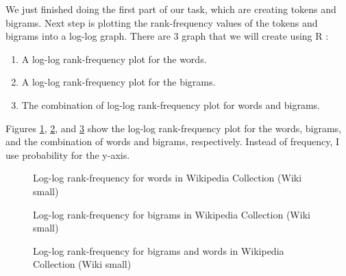 \documentclass[letterpaper,11pt]{article}
\begin{document}
We just finished doing the first part of our task, which are creating tokens and bigrams. Next step is plotting the rank-frequency values of the tokens and bigrams into a log-log graph. There are 3 graph that we will create using R \cite{r-project}:
\begin{enumerate}
\item A log-log rank-frequency plot for the words.
\item A log-log rank-frequency plot for the bigrams.
\item The combination of log-log rank-frequency plot for words and bigrams. 
\end{enumerate}

Figures \ref{fig:4_1_rank_freq_plot}, \ref{fig:4_1_rank_freq_bigram_plot}, and \ref{fig:4_1_log_log_plot_combination} show the log-log rank-frequency plot for the words, bigrams, and the combination of words and bigrams, respectively. Instead of frequency, I use probability for the y-axis. 

\begin{figure}[H]
	\centering
	\caption{Log-log rank-frequency for words in Wikipedia Collection (Wiki small)}
	\label{fig:4_1_rank_freq_plot}
\end{figure}

\begin{figure}[H]
	\centering
	\caption{Log-log rank-frequency for bigrams in Wikipedia Collection (Wiki small)}
	\label{fig:4_1_rank_freq_bigram_plot}
\end{figure}

\begin{figure}[H]
	\centering
	\caption{Log-log rank-frequency for bigrams and words in Wikipedia Collection (Wiki small)}
	\label{fig:4_1_log_log_plot_combination}
\end{figure}
\end{document}
